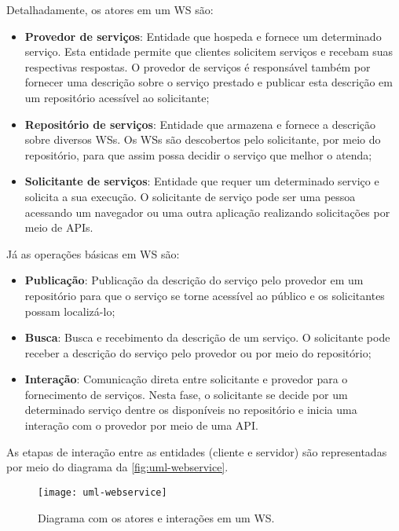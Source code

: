Detalhadamente, os atores em um WS são:

\begin{itemize}
	\item \textbf{Provedor de serviços}: Entidade que hospeda e fornece um determinado serviço. Esta entidade permite que clientes solicitem serviços e recebam suas respectivas respostas. O provedor de serviços é responsável também por fornecer uma descrição sobre o serviço prestado e publicar esta descrição em um repositório acessível ao solicitante;

	\item \textbf{Repositório de serviços}: Entidade que armazena e fornece a descrição sobre diversos WSs. Os WSs são descobertos pelo solicitante, por meio do repositório, para que assim possa decidir o serviço que melhor o atenda;

	\item \textbf{Solicitante de serviços}: Entidade que requer um determinado serviço e solicita a sua execução. O solicitante de serviço pode ser uma pessoa acessando um navegador ou uma outra aplicação realizando solicitações por meio de APIs.
\end{itemize}

Já as operações básicas em WS são:

\begin{itemize}
	\item \textbf{Publicação}: Publicação da descrição do serviço pelo provedor em um repositório para que o serviço se torne acessível ao público e os solicitantes possam localizá-lo;

	\item \textbf{Busca}: Busca e recebimento da descrição de um serviço. O solicitante pode receber a descrição do serviço pelo provedor ou por meio do repositório;

	\item \textbf{Interação}: Comunicação direta entre solicitante e provedor para o fornecimento de serviços. Nesta fase, o solicitante se decide por um determinado serviço dentre os disponíveis no repositório e inicia uma interação com o provedor por meio de uma API.
\end{itemize}

As etapas de interação entre as entidades (cliente e servidor) são representadas por meio do diagrama da \autoref{fig:uml-webservice}.

\begin{figure}[htb]
	\centering
	\texttt{[image: uml-webservice]}
	\caption{Diagrama com os atores e interações em um WS.}
	\label{fig:uml-webservice}
\end{figure}


